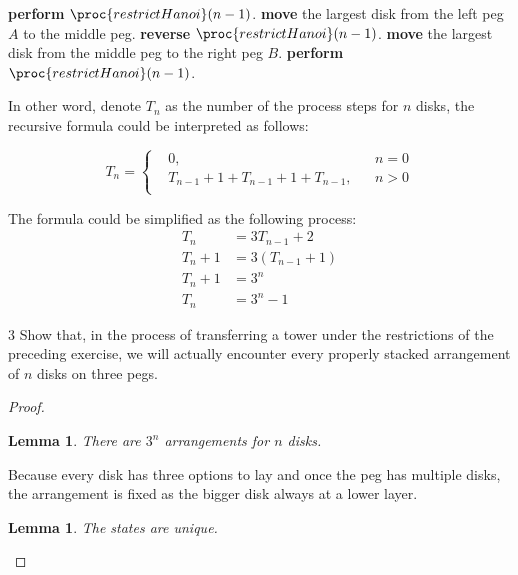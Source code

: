 \documentclass[a4paper,12pt]{article}
\makeatletter
\newtheorem{lemma}[theorem]{Lemma}
\newtheorem*{solution}{Solution}
\theoremstyle{definition}
\renewenvironment{solution}[1][Solution] {\par\pushQED{\qed}\normalfont\topsep6\p@\@plus6\p@\relax\trivlist\item[\hskip\labelsep\bfseries#1\@addpunct{.}]\ignorespaces}{\popQED\endtrivlist\@endpefalse} \makeatother
\newenvironment{problems}{\begin{list}{}{\renewcommand{\makelabel}[1]{\textbf{##1}\hfil}}}{\end{list}}
\makeatother
\begin{document}
\begin{problems}
\begin{solution}
        \begin{codebox}
        \li \textbf{perform} $\proc{restrictHanoi}(n-1)$.
        \li \textbf{move} the largest disk from the left peg $A$ to the middle peg.
        \li \textbf{reverse} $\proc{restrictHanoi}(n-1)$.
        \li \textbf{move} the largest disk from the middle peg to the right peg $B$.
        \li \textbf{perform} $\proc{restrictHanoi}(n-1)$.
        \end{codebox}

        In other word, denote $T_n$ as the number of the process steps for $n$ disks, the recursive formula could be interpreted as follows:
        
        \begin{equation*}
            T_n = \left\{\begin{aligned}
               &0, && n=0\\
               &T_{n-1}+1+T_{n-1}+1+T_{n-1}, && n>0\\
            \end{aligned}\right.
        \end{equation*}

        The formula could be simplified as the following process:
        \begin{align*}
            T_n &= 3T_{n-1} + 2 \\
            T_n + 1 &= 3(T_{n-1}+1) \\
            T_n + 1 &= 3^n \\
            T_n &= 3^n -1 
        \end{align*}


    \end{solution}

    \item[3] Show that, in the process of transferring a tower under the restrictions of the preceding exercise, we will actually encounter every properly stacked arrangement of $n$ disks on three pegs.
    
    \begin{proof}
        \begin{lemma}\label{lem:count}
            There are $3^n$ arrangements for $n$ disks.
        \end{lemma}

        Because every disk has three options to lay and once the peg has multiple disks, the arrangement is fixed as the bigger disk always at a lower layer.

        \begin{lemma}\label{lem:unique}
            The states are unique.
        \end{lemma}


\end{proof}
\end{problems}
\end{document}
